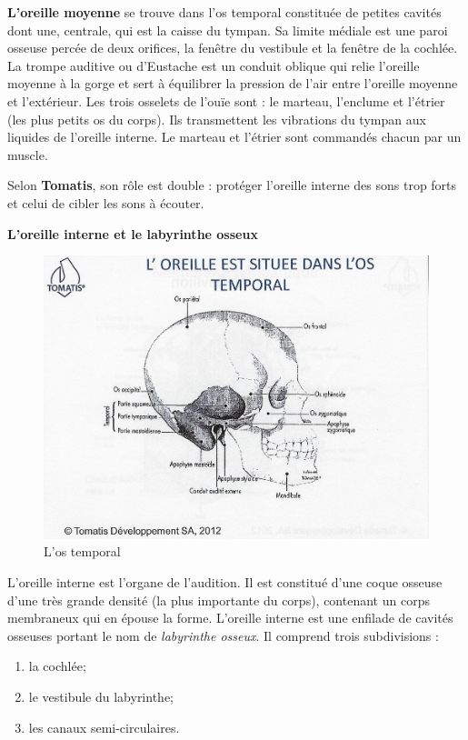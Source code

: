 \textbf{L'oreille moyenne }se trouve dans l'os temporal constituée de petites
cavités dont une, centrale, qui est la caisse du tympan. Sa limite
médiale est une paroi osseuse percée de deux orifices, la fenêtre
du vestibule et la fenêtre de la cochlée. La trompe auditive ou d'Eustache
est un conduit oblique qui relie l'oreille moyenne à la gorge et sert
à équilibrer la pression de l'air entre l'oreille moyenne et l'extérieur.
Les trois osselets de l'ouïe sont : le marteau, l'enclume et l'étrier
(les plus petits os du corps). Ils transmettent les vibrations du
tympan aux liquides de l'oreille interne.
Le marteau et l'étrier sont commandés chacun par un muscle.


Selon \textbf{Tomatis}, son rôle est double : protéger l'oreille interne des sons
trop forts et celui de cibler les sons à écouter.

\textbf{L'oreille interne et le labyrinthe osseux}

\begin{figure}
	\centering
	\includegraphics[width=0.7\linewidth]{images/Loreilleostemporal_crane.jpg}
	\caption[L'os temporal]{L'os temporal}
	\label{fig:loreilleostemporal18}
\end{figure}

L'oreille interne est l'organe de l'audition. Il
est constitué d'une coque osseuse d'une très grande densité (la plus
importante du corps), contenant un corps membraneux qui en épouse
la forme. 
L'oreille interne est une enfilade de cavités osseuses portant 
le nom de \emph{labyrinthe osseux}. Il comprend trois subdivisions : 
\begin{enumerate}
	\item la cochlée;
	\item le vestibule du labyrinthe;
	\item  les canaux semi-circulaires.
\end{enumerate}

